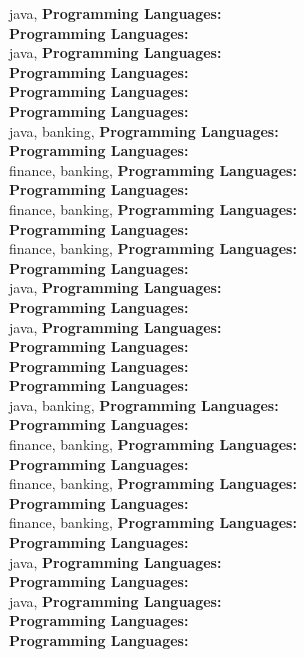 java, \textbf{Programming Languages:} \\
\textbf{Programming Languages:} \\
java, \textbf{Programming Languages:} \\
\textbf{Programming Languages:} \\
\textbf{Programming Languages:} \\
\textbf{Programming Languages:} \\
java, banking, \textbf{Programming Languages:} \\
\textbf{Programming Languages:} \\
finance, banking, \textbf{Programming Languages:} \\
\textbf{Programming Languages:} \\
finance, banking, \textbf{Programming Languages:} \\
\textbf{Programming Languages:} \\
finance, banking, \textbf{Programming Languages:} \\
\textbf{Programming Languages:} \\
java, \textbf{Programming Languages:} \\
\textbf{Programming Languages:} \\
java, \textbf{Programming Languages:} \\
\textbf{Programming Languages:} \\
\textbf{Programming Languages:} \\
\textbf{Programming Languages:} \\
java, banking, \textbf{Programming Languages:} \\
\textbf{Programming Languages:} \\
finance, banking, \textbf{Programming Languages:} \\
\textbf{Programming Languages:} \\
finance, banking, \textbf{Programming Languages:} \\
\textbf{Programming Languages:} \\
finance, banking, \textbf{Programming Languages:} \\
\textbf{Programming Languages:} \\
java, \textbf{Programming Languages:} \\
\textbf{Programming Languages:} \\
java, \textbf{Programming Languages:} \\
\textbf{Programming Languages:} \\
\textbf{Programming Languages:} \\
